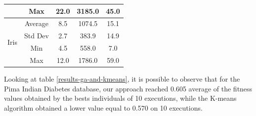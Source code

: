 \documentclass[journal]{IEEEtran}
\begin{document}
\begin{table}[]
\begin{tabular}{|c|c|c|c|c|}
			& Max                                      & 22.0                                                                                          & 3185.0                                                                                                          & 45.0                                                                                                \\ \hline
			\multirow{4}{*}{Iris}                  & Average                                  & 8.5                                                                                           & 1074.5                                                                                                          & 15.1                                                                                                \\ \cline{2-5} 
			& Std Dev                                  & 2.7                                                                                           & 383.9                                                                                                           & 14.9                                                                                                \\ \cline{2-5} 
			& Min                                      & 4.5                                                                                           & 558.0                                                                                                           & 7.0                                                                                                 \\ \cline{2-5} 
			& Max                                      & 12.0                                                                                          & 1786.0                                                                                                          & 59.0                                                                                                \\ \hline
		\end{tabular}
	\end{table}
	
	Looking at table \ref{results-ga-and-kmeans}, it is possible to observe that for the Pima Indian Diabetes database, our approach reached 0.605 average of the fitness values obtained by the bests individuals of 10 executions, while the K-means algorithm obtained a lower value equal to 0.570 on 10 executions.
	
\end{document}

